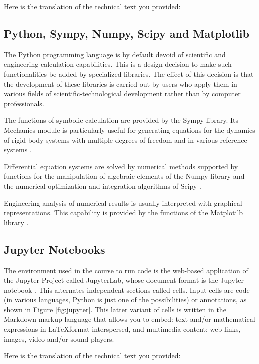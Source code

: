 Here is the translation of the technical text you provided:

\subsection{Python, Sympy, Numpy, Scipy and Matplotlib}

The Python programming language is by default devoid of scientific and engineering calculation capabilities. This is a design decision to make such functionalities be added by specialized libraries. The effect of this decision is that the development of these libraries is carried out by users who apply them in various fields of scientific-technological development rather than by computer professionals.

The functions of symbolic calculation are provided by the Sympy library. Its Mechanics module is particularly useful for generating equations for the dynamics of rigid body systems with multiple degrees of freedom and in various reference systems \cite{simpy}.

Differential equation systems are solved by numerical methods supported by functions for the manipulation of algebraic elements of the Numpy library \cite{numpy} and the numerical optimization and integration algorithms of Scipy \cite{SciPy}.

Engineering analysis of numerical results is usually interpreted with graphical representations. This capability is provided by the functions of the Matplotilb library \cite{matplotlib}.

\subsection{Jupyter Notebooks}

The environment used in the course to run code is the web-based application of the Jupyter Project called JupyterLab, whose document format is the Jupyter notebook \cite{Kluyver2016jupyter}. This alternates independent sections called cells. Input cells are code (in various languages, Python is just one of the possibilities) or annotations, as shown in Figure \ref{fig:jupyter}. This latter variant of cells is written in the Markdown markup language \cite{markdown} that allows you to embed: text and/or mathematical expressions in \LaTeX format interspersed, and multimedia content: web links, images, video and/or sound players.


Here is the translation of the technical text you provided:


